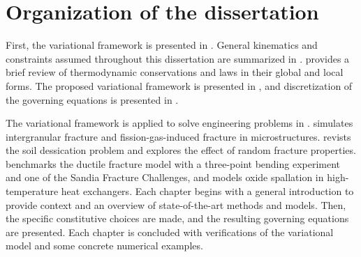 \section{Organization of the dissertation}

First, the variational framework is presented in . General kinematics and constraints assumed throughout this dissertation are summarized in .  provides a brief review of thermodynamic conservations and laws in their global and local forms.
The proposed variational framework is presented in , and discretization of the governing equations is presented in .

The variational framework is applied to solve engineering problems in .  simulates intergranular fracture and fission-gas-induced fracture in microstructures.  revists the soil dessication problem and explores the effect of random fracture properties.  benchmarks the ductile fracture model with a three-point bending experiment and one of the Sandia Fracture Challenges, and models oxide spallation in high-temperature heat exchangers. Each chapter begins with a general introduction to provide context and an overview of state-of-the-art methods and models. Then, the specific constitutive choices are made, and the resulting governing equations are presented. Each chapter is concluded with verifications of the variational model and some concrete numerical examples.
